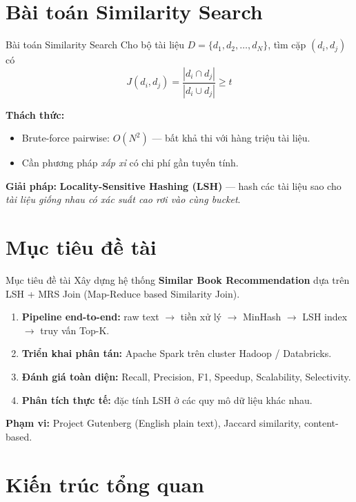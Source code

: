 \documentclass[10pt,aspectratio=169]{beamer}
\begin{document}
\section{Bài toán Similarity Search}

\begin{frame}{Bài toán Similarity Search}
  Cho bộ tài liệu $D = \{d_1, d_2, \ldots, d_N\}$, tìm cặp $(d_i, d_j)$ có
  $$J(d_i, d_j) = \frac{|d_i \cap d_j|}{|d_i \cup d_j|} \geq t$$

  \textbf{Thách thức:}
  \begin{itemize}
    \item Brute-force pairwise: $O(N^2)$ --- bất khả thi với hàng triệu tài liệu.
    \item Cần phương pháp \emph{xấp xỉ} có chi phí gần tuyến tính.
  \end{itemize}

  \vfill
  \textbf{Giải pháp:} \textbf{Locality-Sensitive Hashing (LSH)} --- hash các tài liệu sao cho \emph{tài liệu giống nhau có xác suất cao rơi vào cùng bucket}.
\end{frame}

\section{Mục tiêu đề tài}

\begin{frame}{Mục tiêu đề tài}
  Xây dựng hệ thống \textbf{Similar Book Recommendation} dựa trên LSH + MRS Join (Map-Reduce based Similarity Join).

  \begin{enumerate}
    \item \textbf{Pipeline end-to-end:} raw text $\rightarrow$ tiền xử lý $\rightarrow$ MinHash $\rightarrow$ LSH index $\rightarrow$ truy vấn Top-K.
    \item \textbf{Triển khai phân tán:} Apache Spark trên cluster Hadoop / Databricks.
    \item \textbf{Đánh giá toàn diện:} Recall, Precision, F1, Speedup, Scalability, Selectivity.
    \item \textbf{Phân tích thực tế:} đặc tính LSH ở các quy mô dữ liệu khác nhau.
  \end{enumerate}

  \vfill
  \textbf{Phạm vi:} Project Gutenberg (English plain text), Jaccard similarity, content-based.
\end{frame}

\section{Kiến trúc tổng quan}
\end{document}
